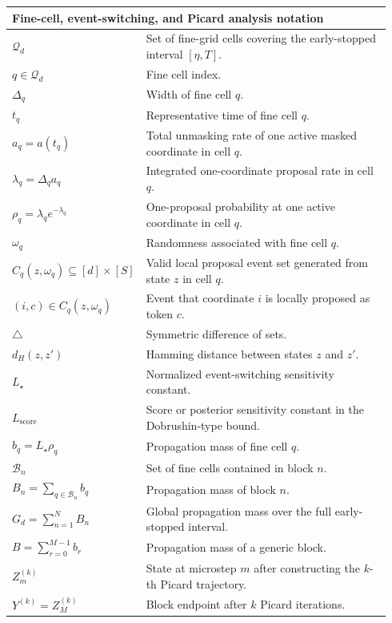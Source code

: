 \documentclass{article}
\begin{document}
\begin{longtable}{p{0.28\linewidth}p{0.66\linewidth}}
\midrule
\multicolumn{2}{l}{\textbf{Fine-cell, event-switching, and Picard analysis notation}}\\
\midrule

\(\mathcal Q_d\) & Set of fine-grid cells covering the early-stopped interval \([\eta,T]\). \\
\(q\in\mathcal Q_d\) & Fine cell index. \\
\(\Delta_q\) & Width of fine cell \(q\). \\
\(t_q\) & Representative time of fine cell \(q\). \\
\(a_q=a(t_q)\) & Total unmasking rate of one active masked coordinate in cell \(q\). \\
\(\lambda_q=\Delta_q a_q\) & Integrated one-coordinate proposal rate in cell \(q\). \\
\(\rho_q=\lambda_q e^{-\lambda_q}\) & One-proposal probability at one active coordinate in cell \(q\). \\
\(\omega_q\) & Randomness associated with fine cell \(q\). \\
\(C_q(z,\omega_q)\subseteq[d]\times[S]\) & Valid local proposal event set generated from state \(z\) in cell \(q\). \\
\((i,c)\in C_q(z,\omega_q)\) & Event that coordinate \(i\) is locally proposed as token \(c\). \\
\(\triangle\) & Symmetric difference of sets. \\
\(d_H(z,z')\) & Hamming distance between states \(z\) and \(z'\). \\
\(L_\star\) & Normalized event-switching sensitivity constant. \\
\(L_{\mathrm{score}}\) & Score or posterior sensitivity constant in the Dobrushin-type bound. \\
\(b_q=L_\star\rho_q\) & Propagation mass of fine cell \(q\). \\
\(\mathcal B_n\) & Set of fine cells contained in block \(n\). \\
\(B_n=\sum_{q\in\mathcal B_n}b_q\) & Propagation mass of block \(n\). \\
\(G_d=\sum_{n=1}^N B_n\) & Global propagation mass over the full early-stopped interval. \\
\(B=\sum_{r=0}^{M-1}b_r\) & Propagation mass of a generic block. \\
\(Z_m^{(k)}\) & State at microstep \(m\) after constructing the \(k\)-th Picard trajectory. \\
\(Y^{(k)}=Z_M^{(k)}\) & Block endpoint after \(k\) Picard iterations. \\

\end{longtable}
\end{document}
